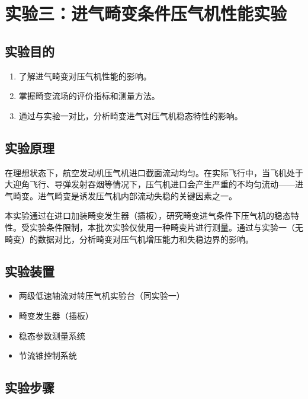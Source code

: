 
\section{实验三：进气畸变条件压气机性能实验}

\subsection{实验目的}

\begin{enumerate}
    \item 了解进气畸变对压气机性能的影响。
    \item 掌握畸变流场的评价指标和测量方法。
    \item 通过与实验一对比，分析畸变进气对压气机稳态特性的影响。
\end{enumerate}

\subsection{实验原理}

在理想状态下，航空发动机压气机进口截面流动均匀。在实际飞行中，当飞机处于大迎角飞行、导弹发射吞烟等情况下，压气机进口会产生严重的不均匀流动——进气畸变。进气畸变是诱发压气机内部流动失稳的关键因素之一。

本实验通过在进口加装畸变发生器（插板），研究畸变进气条件下压气机的稳态特性。受实验条件限制，本批次实验仅使用一种畸变片进行测量。通过与实验一（无畸变）的数据对比，分析畸变对压气机增压能力和失稳边界的影响。

\subsection{实验装置}

\begin{itemize}
    \item 两级低速轴流对转压气机实验台（同实验一）
    \item 畸变发生器（插板）
    \item 稳态参数测量系统
    \item 节流锥控制系统
\end{itemize}

\subsection{实验步骤}

